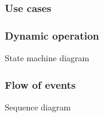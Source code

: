 \subsubsection{Use cases}
\label{sec:use-cases}

\subsubsection{Dynamic operation}
\label{sec:dyn-oper}
State machine diagram

\subsubsection{Flow of events}
\label{sec:flow-events}
Sequence diagram

